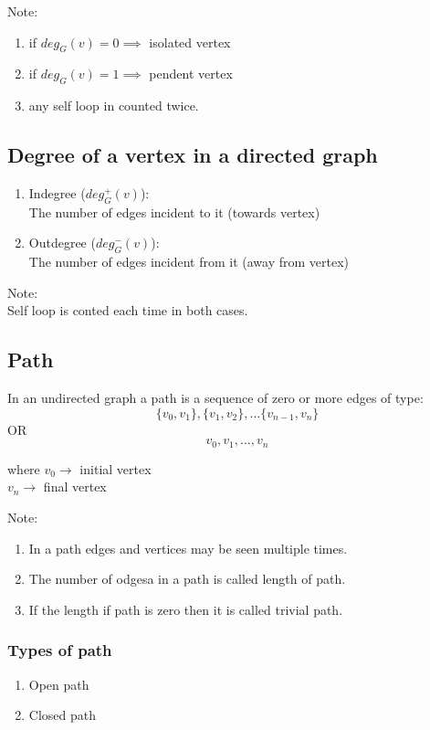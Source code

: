 \documentclass[11pt,letterpaper]{article}
\begin{document}
Note: 
\begin{enumerate}
  \item if $deg_G(v) = 0 \implies $ isolated vertex
  \item if $deg_G(v) = 1 \implies $ pendent vertex
  \item any self loop in counted twice.
\end{enumerate}

\subsection{Degree of a vertex in a directed graph}
\begin{enumerate}
  \item Indegree ($deg_G^+(v)$): \\
    The number of edges incident to it (towards vertex)
  \item Outdegree ($deg_G^-(v)$): \\
    The number of edges incident from it (away from vertex)
\end{enumerate}
Note: \\
\indent Self loop is conted each time in both cases.

\subsection{Path}
In an undirected graph a path is a sequence of zero or more edges of type: 
\[
  \{v_0,v_1\}, \{v_1,v_2\}, \dots \{v_{n-1},v_n\}
\]
OR
\[
  v_0,v_1,\dots,v_n
\]

where $v_0 \rightarrow$  initial vertex\\
$v_n \rightarrow$  final vertex

Note:
\begin{enumerate}
  \item In a path edges and vertices may be seen multiple times.
  \item The number of odgesa in a path is called length of path.
  \item If the length if path is zero then it is called trivial path.
\end{enumerate}

\subsubsection{Types of path}
\begin{enumerate}
  \item Open path
  \item Closed path
\end{enumerate}
\end{document}
